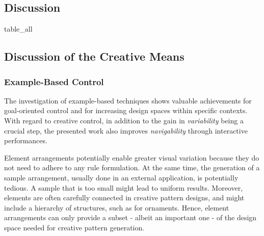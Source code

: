 

\subsection{Discussion}
\label{subsec:analysis_discussion}



{table_all}





\subsection{Discussion of the Creative Means}
\label{subsec:analysis_creative_means}


\subsubsection{Example-Based Control}
\label{subsubsec:analysis_creative_means_example}

The investigation of example-based techniques shows valuable achievements for goal-oriented control and for increasing design spaces within specific contexts. With regard to creative control, in addition to the gain in \textit{variability} being a crucial step, the presented work also improves \textit{navigability} through interactive performances.

Element arrangements potentially enable greater visual variation because they do not need to adhere to any rule formulation. At the same time, the generation of a sample arrangement, usually done in an external application, is potentially tedious. A sample that is too small might lead to uniform results. Moreover, elements are often carefully connected in creative pattern designs, and might include a hierarchy of structures, such as for ornaments. Hence, element arrangements can only provide a subset - albeit an important one - of the design space needed for creative pattern generation.

